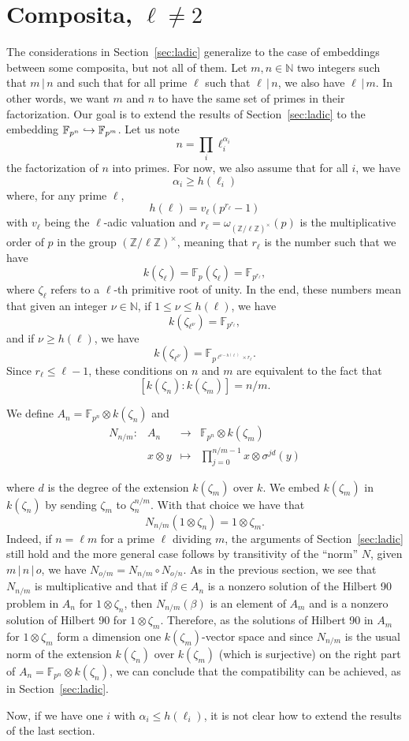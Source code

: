 \documentclass[a4paper,11pt]{article}
\begin{document}
\section{Composita, $\ell\neq2$}

The considerations in Section~\ref{sec:ladic} generalize to the case of
embeddings between some composita, but not all of them. Let $m, n\in\mathbb{N}$
two integers such that $m\,|\,n$ and such that for all prime $\ell$ such that
$\ell\,|\,n$, we also have $\ell\,|\,m$. In other words, we want $m$ and $n$ to
have the same set of primes in their factorization. Our goal is to extend the
results of Section~\ref{sec:ladic} to the embedding
$\mathbb{F}_{p^n}\hookrightarrow\mathbb{F}_{p^m}$. Let us note 
\[
  n = \prod_i \ell_i^{\alpha_i}
\]
the factorization of $n$ into primes. For now, we also assume that for all $i$,
we have 
\[
  \alpha_i\geq h(\ell_i)
\]
where, for any prime $\ell$, 
\[
  h(\ell) = v_\ell(p^{r_\ell}-1)
\]
with $v_\ell$ being the $\ell$-adic valuation and
$r_\ell=\omega_{(\mathbb{Z}/\ell\mathbb{Z})^\times}(p)$ is the multiplicative
order of $p$ in the group $(\mathbb{Z}/\ell\mathbb{Z})^\times$, meaning that
$r_\ell$ is the number such that we have 
\[
  k(\zeta_\ell)=\mathbb{F}_p(\zeta_\ell)=\mathbb{F}_{p^{r_\ell}},
\]
where $\zeta_\ell$ refers to a $\ell$-th primitive root of unity.
In the end, these numbers mean that given an integer $\nu\in\mathbb{N}$, if
$1\leq\nu\leq h(\ell)$, we have
\[
  k(\zeta_{\ell^\nu}) = \mathbb{F}_{p^{r_\ell}},
\]
and if $\nu\geq h(\ell)$, we have
\[
  k(\zeta_{\ell^\nu}) = \mathbb{F}_{p^{\ell^{\nu-h(\ell)}\times r_\ell}}.
\]
Since $r_\ell\leq\ell-1$, these conditions on $n$ and $m$ are equivalent to the fact that
\[
  [k(\zeta_n):k(\zeta_m)] = n/m.
\]

We define $A_n=\mathbb{F}_{p^n}\otimes k(\zeta_n)$ and
\[
\begin{array}{cccc}
  N_{n/m}: & A_n & \to & \mathbb{F}_{p^n}\otimes k(\zeta_m) \\
  & x\otimes y & \mapsto & \prod_{j=0}^{n/m-1} x \otimes \sigma^{jd}(y)
\end{array}
\]

where $d$ is the degree of the extension $k(\zeta_m)$ over $k$. We embed
$k(\zeta_m)$ in $k(\zeta_n)$ by sending $\zeta_m$ to $\zeta_n^{n/m}$. With that
choice we have that
\[
  N_{n/m}(1\otimes\zeta_n) = 1\otimes\zeta_m.
\]
Indeed, if $n = \ell m$ for a prime $\ell$ dividing $m$, the arguments of
Section~\ref{sec:ladic} still hold and the more general case follows by
transitivity of the ``norm'' $N$, \ie given $m\,|\,n\,|\,o$, we have
$N_{o/m}=N_{n/m}\circ N_{o/n}$. As in the previous section, we see that
$N_{n/m}$ is multiplicative and that if $\beta\in A_n$ is a nonzero solution of
the Hilbert 90 problem in $A_n$ for $1\otimes\zeta_n$, then $N_{n/m}(\beta)$ is
an element of $A_m$ and is a nonzero solution of Hilbert 90 for
$1\otimes\zeta_m$. Therefore, as the solutions of Hilbert 90 in $A_m$ for
$1\otimes\zeta_m$ form a dimension one $k(\zeta_m)$-vector space and since
$N_{n/m}$ is the usual norm of the extension $k(\zeta_n)$ over $k(\zeta_m)$
(which is surjective) on the right part of $A_n=\mathbb{F}_{p^n}\otimes
k(\zeta_n)$, we can conclude that the compatibility can be achieved, as in
Section~\ref{sec:ladic}.

Now, if we have one $i$ with $\alpha_i\leq h(\ell_i)$, it is not clear how to
extend the results of the last section.
\end{document}
